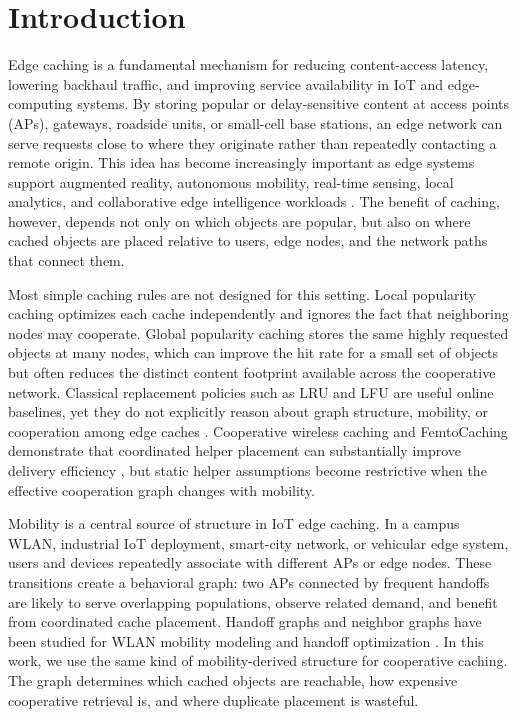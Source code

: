 \section{Introduction}

Edge caching is a fundamental mechanism for reducing content-access latency, lowering backhaul traffic, and improving service availability in IoT and edge-computing systems. By storing popular or delay-sensitive content at access points (APs), gateways, roadside units, or small-cell base stations, an edge network can serve requests close to where they originate rather than repeatedly contacting a remote origin. This idea has become increasingly important as edge systems support augmented reality, autonomous mobility, real-time sensing, local analytics, and collaborative edge intelligence workloads \cite{Satyanarayanan2017Edge,Chiang2016Fog,Bastug2014,Mao2017MEC,bai2025collaborative}. The benefit of caching, however, depends not only on which objects are popular, but also on where cached objects are placed relative to users, edge nodes, and the network paths that connect them.

Most simple caching rules are not designed for this setting. Local popularity caching optimizes each cache independently and ignores the fact that neighboring nodes may cooperate. Global popularity caching stores the same highly requested objects at many nodes, which can improve the hit rate for a small set of objects but often reduces the distinct content footprint available across the cooperative network. Classical replacement policies such as LRU and LFU are useful online baselines, yet they do not explicitly reason about graph structure, mobility, or cooperation among edge caches \cite{Podlipnig2003,Li2018CachingSurvey}. Cooperative wireless caching and FemtoCaching demonstrate that coordinated helper placement can substantially improve delivery efficiency \cite{Shanmugam2013,Golrezaei2014JSAC}, but static helper assumptions become restrictive when the effective cooperation graph changes with mobility.

Mobility is a central source of structure in IoT edge caching. In a campus WLAN, industrial IoT deployment, smart-city network, or vehicular edge system, users and devices repeatedly associate with different APs or edge nodes. These transitions create a behavioral graph: two APs connected by frequent handoffs are likely to serve overlapping populations, observe related demand, and benefit from coordinated cache placement. Handoff graphs and neighbor graphs have been studied for WLAN mobility modeling and handoff optimization \cite{kim2005mobility_wifi_ap,shin2004neighbor_graphs}. In this work, we use the same kind of mobility-derived structure for cooperative caching. The graph determines which cached objects are reachable, how expensive cooperative retrieval is, and where duplicate placement is wasteful.

